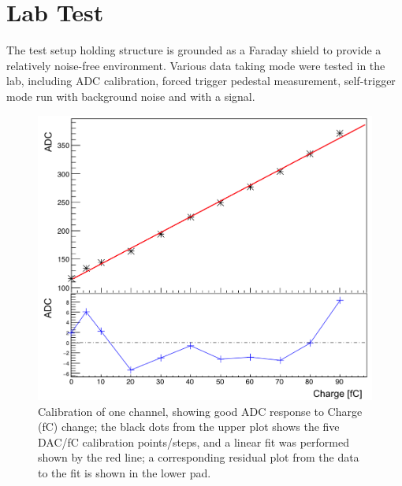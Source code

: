 \documentclass[journal]{IEEEtran}
\begin{document}
\section{Lab Test}
The test setup holding structure is grounded as a Faraday shield to provide a relatively noise-free environment.
Various data taking mode were tested in the lab, including ADC calibration, forced trigger pedestal measurement, self-trigger mode run with background noise and with a signal.
\begin{figure}[!ht]%
  \centering
  \includegraphics[width=0.95\linewidth]{pics/lab_2.png}
  \caption{Calibration of one channel, showing good ADC response to Charge (fC) change;
  the black dots from the upper plot shows the five DAC/fC calibration points/steps, and a linear fit was performed shown by the red line;
  a corresponding residual plot from the data to the fit is shown in the lower pad.}%
\label{fig:lab1}%
\end{figure}
\end{document}
